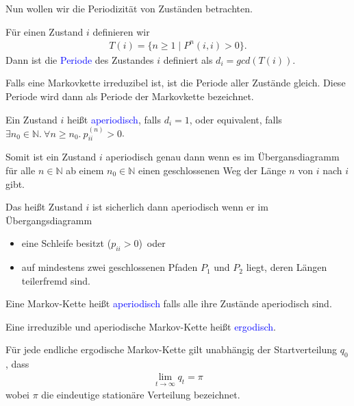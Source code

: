 \documentclass{beamer}
\def\padding{\vspace{0.5cm}}
\def\spadding{\vspace{0.25cm}}
\def\b{\textcolor{blue}}
\begin{document}
\begin{frame}
    Nun wollen wir die Periodizität von Zuständen betrachten.\pause
    \begin{definition}
        Für einen Zustand $i$ definieren wir
        \begin{align*}
            T(i) = \{n \geq 1 \mid P^n(i,i) > 0\}.
        \end{align*}\pause
        Dann ist die \b{Periode} des Zustandes $i$ definiert als $d_i = gcd(T(i))$.\pause\par\padding
        Falls eine Markovkette irreduzibel ist, ist die Periode aller Zustände gleich. Diese Periode wird dann als Periode der Markovkette bezeichnet.
    \end{definition}
\end{frame}

\begin{frame}
    \begin{definition}
        Ein Zustand $i$ heißt \b{aperiodisch}, falls $d_i = 1$\pause, oder equivalent, falls $
\exists n_0 \in \mathbb{N}.\ \forall n \geq n_0.\ p_{ii}^{(n)} > 0$.\pause\par\spadding
        Somit ist ein Zustand $i$ aperiodisch genau dann wenn es im Übergansdiagramm für alle $n \in \mathbb{N}$ ab einem $n_0 \in \mathbb{N}$ einen geschlossenen Weg der Länge $n$ von $i$ nach $i$ gibt.\pause\par\spadding
        Das heißt Zustand $i$ ist sicherlich dann aperiodisch wenn er im Übergangsdiagramm
        \begin{itemize}
            \item eine Schleife besitzt ($p_{ii} > 0$)\pause\ oder
            \item auf mindestens zwei geschlossenen Pfaden $P_1$ und $P_2$ liegt, deren Längen teilerfremd sind.
        \end{itemize}\pause\par\padding
        Eine Markov-Kette heißt \b{aperiodisch} falls alle ihre Zustände aperiodisch sind.
    \end{definition}
\end{frame}

\begin{frame}
    \begin{definition}
        Eine irreduzible und aperiodische Markov-Kette heißt \b{ergodisch}.
    \end{definition}\pause\par\padding
    Für jede endliche ergodische Markov-Kette gilt unabhängig der Startverteilung $q_0$, dass
    \begin{align*}
        \lim_{t \to \infty} q_t = \pi
    \end{align*}
    wobei $\pi$ die eindeutige stationäre Verteilung bezeichnet.
\end{frame}
\end{document}
